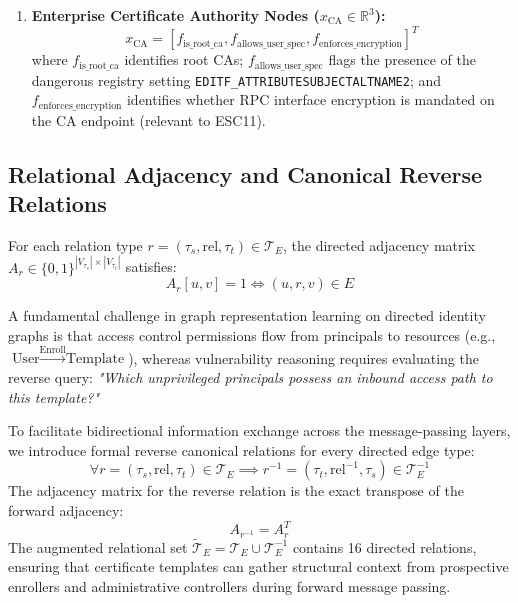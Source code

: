 \begin{enumerate}
    \item \textbf{Enterprise Certificate Authority Nodes ($x_{\text{CA}} \in \mathbb{R}^3$):}
    \begin{equation}
    x_{\text{CA}} = [f_{\text{is\_root\_ca}}, f_{\text{allows\_user\_spec}}, f_{\text{enforces\_encryption}}]^T
    \end{equation}
    where $f_{\text{is\_root\_ca}}$ identifies root CAs; $f_{\text{allows\_user\_spec}}$ flags the presence of the dangerous registry setting \texttt{EDITF\_ATTRIBUTE}\allowbreak\texttt{SUBJECTALTNAME2}; and $f_{\text{enforces\_encryption}}$ identifies whether RPC interface encryption is mandated on the CA endpoint (relevant to ESC11).
\end{enumerate}

\subsection{Relational Adjacency and Canonical Reverse Relations}
For each relation type $r = (\tau_s, \text{rel}, \tau_t) \in \mathcal{T}_E$, the directed adjacency matrix $A_r \in \{0, 1\}^{|V_{\tau_s}| \times |V_{\tau_t}|}$ satisfies:
\begin{equation}
A_r[u, v] = 1 \iff (u, r, v) \in E
\end{equation}

A fundamental challenge in graph representation learning on directed identity graphs is that access control permissions flow from principals to resources (e.g., $\text{User} \xrightarrow{\text{Enroll}} \text{Template}$), whereas vulnerability reasoning requires evaluating the reverse query: \textit{"Which unprivileged principals possess an inbound access path to this template?"}

To facilitate bidirectional information exchange across the message-passing layers, we introduce formal reverse canonical relations for every directed edge type:
\begin{equation}
\forall r = (\tau_s, \text{rel}, \tau_t) \in \mathcal{T}_E \implies r^{-1} = (\tau_t, \text{rel}^{-1}, \tau_s) \in \mathcal{T}_E^{-1}
\end{equation}
The adjacency matrix for the reverse relation is the exact transpose of the forward adjacency:
\begin{equation}
A_{r^{-1}} = A_r^T
\end{equation}
The augmented relational set $\tilde{\mathcal{T}}_E = \mathcal{T}_E \cup \mathcal{T}_E^{-1}$ contains 16 directed relations, ensuring that certificate templates can gather structural context from prospective enrollers and administrative controllers during forward message passing.

